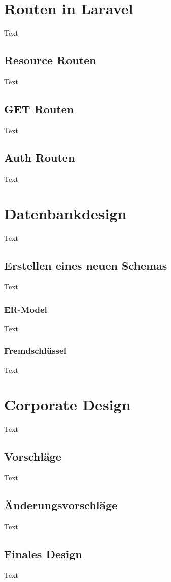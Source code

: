 \section{Routen in Laravel}
Text

\subsection{Resource Routen}
Text

\subsection{GET Routen}
Text

\subsection{Auth Routen}
Text


\section{Datenbankdesign}
Text

\subsection{Erstellen eines neuen Schemas}
Text

\subsubsection{ER-Model}
Text

\subsubsection{Fremdschlüssel}
Text


\section{Corporate Design}
Text

\subsection{Vorschläge}
Text

\subsection{Änderungsvorschläge}
Text

\subsection{Finales Design}
Text

